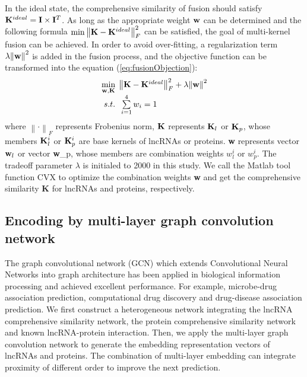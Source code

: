 \documentclass[fleqn,10pt]{wlscirep}
\begin{document}
In the ideal state, the comprehensive similarity of fusion should satisfy ${{\bf{K}}^{ideal}} = {\bf{I}}\times{{\bf{I}}^T}$. As long as the appropriate weight ${\bf{w}}$ can be determined and the following formula $\min \left\| {{\bf{K}} - {{\bf{K}}^{ideal}}} \right\|_F^2$ can be satisfied, the goal of multi-kernel fusion can be achieved. In order to avoid over-fitting, a regularization term $\lambda {\left\| {\bf{w}} \right\|^2}$ is added in the fusion process, and the objective function can be transformed into the equation (\ref{eq:fusionObjection}):
\begin{equation}\label{eq:fusionObjection}
\begin{array}{l}
\mathop {\min }\limits_{{\bf{w,K}}} \;\left\| {{\bf{K}} - {{\bf{K}}^{ideal}}} \right\|_F^2 + \lambda {\left\| {\bf{w}} \right\|^2}\\
\;s.t.\;\;\sum\limits_{i = 1}^4 {{w_i}}  = 1
\end{array}
\end{equation}
where ${\left\|  \cdot  \right\|_F}$ represents Frobenius norm, ${\bf{K}}$ represents ${{\bf{K}}_l}$ or ${{\bf{K}}_p}$, whose members ${{\bf{K}}_l^i}$ or ${{\bf{K}}_p^i}$ are base kernels of lncRNAs or proteins. {\bf{w}} represents vector ${{\bf{w}}_l}$ or vector {{\bf{w}}_p}, whose members are combination weights $w_l^i$ or $w_p^i$. The tradeoff parameter $\lambda$ is initialed to 2000 in this study. We call the Matlab tool function CVX to optimize the combination weights {\bf{w}} and get the comprehensive similarity {\bf{K}} for lncRNAs and proteins, respectively.  

\subsection*{Encoding by multi-layer graph convolution network}
The graph convolutional network (GCN) which extends Convolutional Neural Networks into graph architecture has been applied in biological information processing and achieved excellent performance. For example, %
microbe-drug association prediction\cite{Long2020d}, computational drug discovery\cite{Sun2020b} and drug-disease association prediction\cite{Yu2020d}.
We first construct a heterogeneous network integrating the lncRNA comprehensive similarity network, the protein comprehensive similarity network and known lncRNA-protein interaction. Then, we apply the multi-layer graph convolution network to generate the embedding representation vectors of lncRNAs and proteins. The combination of multi-layer embedding can integrate proximity of different order to improve the next prediction. 
\end{document}
